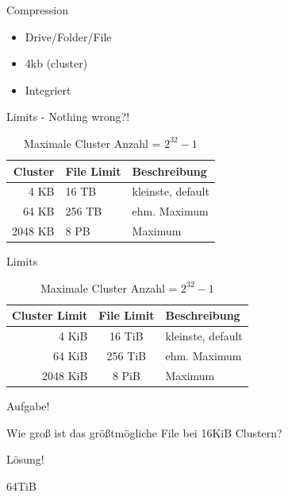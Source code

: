 \documentclass[12pt]{beamer}
\begin{document}
\begin{frame}{Compression}
\begin{itemize}
\item Drive/Folder/File
\item 4kb (cluster)
\item Integriert
\end{itemize}
\end{frame}

\begin{frame}{Limits - Nothing wrong?!}
\begin{center}
\Large
\begin{table}
\begin{tabular}{r|l|l}
\Large Cluster & \Large File Limit & \Large Beschreibung\\
\hline
4 KB & 16 TB & kleinste, default\\
64 KB & 256 TB & ehm. Maximum\\
2048 KB & 8 PB & Maximum
\end{tabular}
\caption{Maximale Cluster Anzahl = $2^{32}-1$}
\end{table}
\end{center}
\end{frame}


\begin{frame}{Limits}
\begin{center}
\Large
\begin{table}
\begin{tabular}{r|c|l}
\Large Cluster Limit & \Large File Limit & \Large Beschreibung\\
\hline
4 KiB & 16 TiB & kleinste, default\\
64 KiB & 256 TiB & ehm. Maximum\\
2048 KiB & 8 PiB & Maximum
\end{tabular}
\caption{Maximale Cluster Anzahl = $2^{32}-1$}
\end{table}
\end{center}
\end{frame}

\begin{frame}{Aufgabe!}
\begin{center}
\huge Wie groß ist das größtmögliche File bei 16KiB Clustern?
\end{center}
\end{frame}

\begin{frame}{Lösung!}
\begin{center}
\huge 64TiB
\end{center}
\end{frame}
\end{document}
